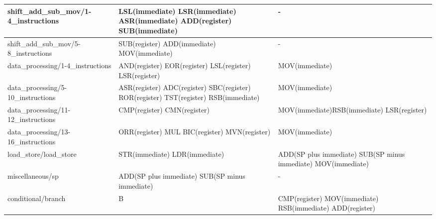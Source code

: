 \begin{tabularx}{\textwidth}{|l|X|X|}
shift{\_}add{\_}sub{\_}mov/1-4{\_}instructions		&  LSL(immediate) \newline LSR(immediate) \newline ASR(immediate) \newline ADD(register) \newline SUB(immediate) & -\\
\hline
shift{\_}add{\_}sub{\_}mov/5-8{\_}instructions			&  SUB(register) \newline ADD(immediate) \newline MOV(immediate) & -\\
\hline
data{\_}processing/1-4{\_}instructions			&  AND(register) \newline EOR(register) \newline LSL(register) \newline LSR(register) & MOV(immediate)\\
\hline
data{\_}processing/5-10{\_}instructions			&  ASR(register) \newline ADC(register) \newline SBC(register) \newline ROR(register) \newline TST(register) \newline RSB(immediate) & MOV(immediate)\\
\hline
data{\_}processing/11-12{\_}instructions			&  CMP(register) \newline CMN(register)  & MOV(immediate)\newline RSB(immediate) \newline LSR(register)\\
\hline
data{\_}processing/13-16{\_}instructions			&  ORR(register) \newline MUL \newline BIC(register) \newline MVN(register) & MOV(immediate)\\
\hline
load{\_}store/load{\_}store		&  STR(immediate) \newline LDR(immediate) & ADD(SP plus immediate) \newline SUB(SP minus immediate) \newline MOV(immediate)\\
\hline
miscellaneous/sp		&  ADD(SP plus immediate) \newline SUB(SP minus immediate) & -\\
\hline
conditional/branch		&  B & CMP(register) \newline MOV(immediate) \newline RSB(immediate) \newline ADD(register)\\
\hline
\end{tabularx}